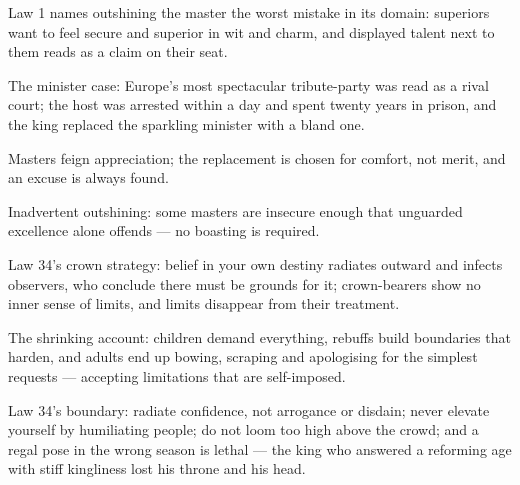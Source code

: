 

\begin{distilled}
  \item Law 1 names outshining the master the worst mistake in its domain: superiors want to feel secure and superior in wit and charm, and displayed talent next to them reads as a claim on their seat.
  \item The minister case: Europe's most spectacular tribute-party was read as a rival court; the host was arrested within a day and spent twenty years in prison, and the king replaced the sparkling minister with a bland one.
  \item Masters feign appreciation; the replacement is chosen for comfort, not merit, and an excuse is always found.
  \item Inadvertent outshining: some masters are insecure enough that unguarded excellence alone offends --- no boasting is required.
  \item Law 34's crown strategy: belief in your own destiny radiates outward and infects observers, who conclude there must be grounds for it; crown-bearers show no inner sense of limits, and limits disappear from their treatment.
  \item The shrinking account: children demand everything, rebuffs build boundaries that harden, and adults end up bowing, scraping and apologising for the simplest requests --- accepting limitations that are self-imposed.
  \item Law 34's boundary: radiate confidence, not arrogance or disdain; never elevate yourself by humiliating people; do not loom too high above the crowd; and a regal pose in the wrong season is lethal --- the king who answered a reforming age with stiff kingliness lost his throne and his head.
\end{distilled}

